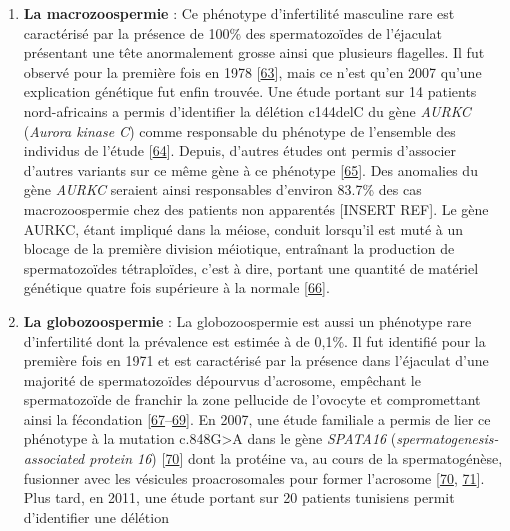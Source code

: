 \documentclass[12pt,twoside]{ugathesis}
\providecommand{\tightlist}{%
  \setlength{\itemsep}{0pt}\setlength{\parskip}{0pt}}
\theoremstyle{definition}
\theoremstyle{definition}
\theoremstyle{remark}
\begin{document}
\begin{enumerate}
  \begin{enumerate}
  \def\labelenumii{\alph{enumii}.}
  \tightlist
  \item
    \textbf{La macrozoospermie} : Ce phénotype d'infertilité masculine
    rare est caractérisé par la présence de 100\% des spermatozoïdes de
    l'éjaculat présentant une tête anormalement grosse ainsi que
    plusieurs flagelles. Il fut observé pour la première fois en 1978
    {[}\protect\hyperlink{ref-Nistal}{63}{]}, mais ce n'est qu'en 2007
    qu'une explication génétique fut enfin trouvée. Une étude portant
    sur 14 patients nord-africains a permis d'identifier la délétion
    c144delC du gène \emph{AURKC} (\emph{Aurora kinase C}) comme
    responsable du phénotype de l'ensemble des individus de l'étude
    {[}\protect\hyperlink{ref-Dieterich2007}{64}{]}. Depuis, d'autres
    études ont permis d'associer d'autres variants sur ce même gène à ce
    phénotype {[}\protect\hyperlink{ref-BenKhelifa2011}{65}{]}. Des
    anomalies du gène \emph{AURKC} seraient ainsi responsables d'environ
    83.7\% des cas macrozoospermie chez des patients non apparentés
    {[}INSERT REF{]}. Le gène AURKC, étant impliqué dans la méiose,
    conduit lorsqu'il est muté à un blocage de la première division
    méiotique, entraînant la production de spermatozoïdes tétraploïdes,
    c'est à dire, portant une quantité de matériel génétique quatre fois
    supérieure à la normale
    {[}\protect\hyperlink{ref-Dieterich2009}{66}{]}.\\
  \item
    \textbf{La globozoospermie} : La globozoospermie est aussi un
    phénotype rare d'infertilité dont la prévalence est estimée à de
    0,1\%. Il fut identifié pour la première fois en 1971 et est
    caractérisé par la présence dans l'éjaculat d'une majorité de
    spermatozoïdes dépourvus d'acrosome, empêchant le spermatozoïde de
    franchir la zone pellucide de l'ovocyte et compromettant ainsi la
    fécondation
    {[}\protect\hyperlink{ref-Dam2006}{67}--\protect\hyperlink{ref-Holstein1973}{69}{]}.
    En 2007, une étude familiale a permis de lier ce phénotype à la
    mutation c.848G\textgreater{}A dans le gène \emph{SPATA16}
    (\emph{spermatogenesis-associated protein 16})
    {[}\protect\hyperlink{ref-Dam2007a}{70}{]} dont la protéine va, au
    cours de la spermatogénèse, fusionner avec les vésicules
    proacrosomales pour former l'acrosome
    {[}\protect\hyperlink{ref-Dam2007a}{70},
    \protect\hyperlink{ref-Lu2006}{71}{]}. Plus tard, en 2011, une étude
    portant sur 20 patients tunisiens permit d'identifier une délétion

\end{enumerate}
\end{enumerate}
\end{document}
